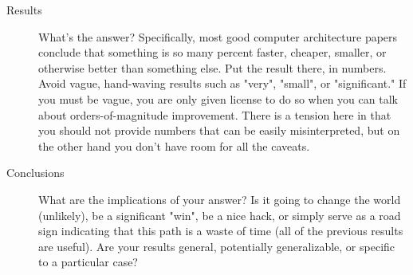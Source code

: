 \begin{description}
  \item[Results] What's the answer? Specifically, most good computer
  architecture papers conclude that something is so many percent faster,
  cheaper, smaller, or otherwise better than something else. Put the result
  there, in numbers. Avoid vague, hand-waving results such as "very", "small",
  or "significant." If you must be vague, you are only given license to do so
  when you can talk about orders-of-magnitude improvement. There is a tension
  here in that you should not provide numbers that can be easily misinterpreted,
  but on the other hand you don't have room for all the caveats.

  \item[Conclusions] What are the implications of your answer? Is it
  going to change the world (unlikely), be a significant "win", be a nice hack,
  or simply serve as a road sign indicating that this path is a waste of time
  (all of the previous results are useful). Are your results general,
  potentially generalizable, or specific to a particular case?
\end{description}